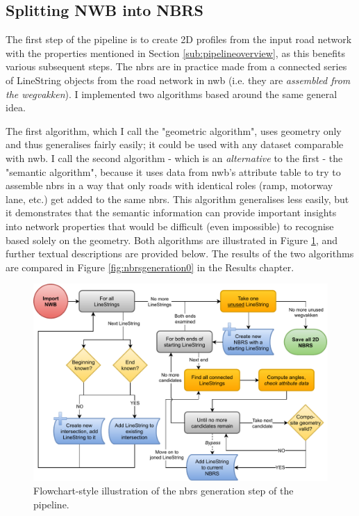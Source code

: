 \subsection{Splitting NWB into NBRS}
\label{sub:m_nbrsgeneration}

The first step of the pipeline is to create 2D profiles from the input road network with the properties mentioned in Section \ref{sub:pipelineoverview}, as this benefits various subsequent steps. The \ac{nbrs} are in practice made from a connected series of LineString objects from the road network in \ac{nwb} (i.e. they are \textit{assembled from the \textit{wegvakken}}). I implemented two algorithms based around the same general idea.

The first algorithm, which I call the "geometric algorithm", uses geometry only and thus generalises fairly easily; it could be used with any dataset comparable with \ac{nwb}. I call the second algorithm - which is an \textit{alternative} to the first - the "semantic algorithm", because it uses data from \ac{nwb}'s attribute table to try to assemble \ac{nbrs} in a way that only roads with identical roles (ramp, motorway lane, etc.) get added to the same \ac{nbrs}. This algorithm generalises less easily, but it demonstrates that the semantic information can provide important insights into network properties that would be difficult (even impossible) to recognise based solely on the geometry. Both algorithms are illustrated in Figure \ref{fig:nbrsgenerationflow}, and further textual descriptions are provided below. The results of the two algorithms are compared in Figure \ref{fig:nbrsgeneration0} in the Results chapter.

\begin{figure}
    \centering
    \includegraphics[width=\linewidth]{final_report/figs/nbrs_generation.pdf}
    \caption{Flowchart-style illustration of the \ac{nbrs} generation step of the pipeline.}
    \label{fig:nbrsgenerationflow}
\end{figure}

